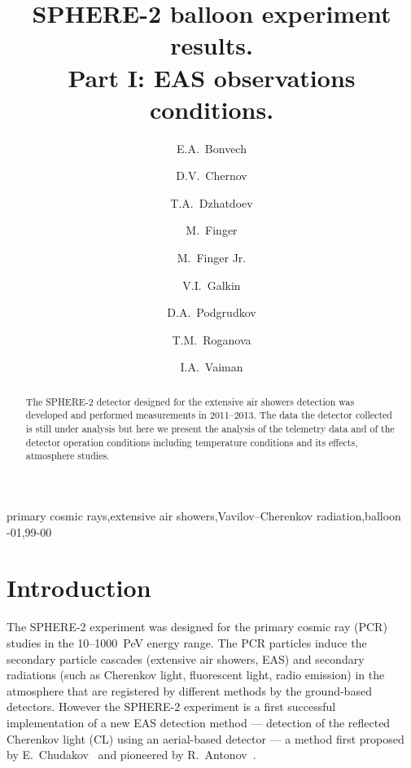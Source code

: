 \documentclass[final,5p,times,twocolumn]{elsarticle}
\begin{document}
\newcommand{\todoi}[1]{\todo[inline]{ #1}}

\listoftodos[Notes]
\linenumbers

\begin{frontmatter}
\title{SPHERE-2 balloon experiment results.\\ Part I: EAS observations conditions.}

\author[address1]{E.A.~Bonvech}
\author[address1]{D.V.~Chernov}
\author[address1]{T.A.~Dzhatdoev}
\author[address2,address3]{M.~Finger}
\author[address2,address3]{M.~Finger Jr.}
\author[address4]{V.I.~Galkin}
\author[address4,address1]{D.A.~Podgrudkov}
\author[address1]{T.M.~Roganova}
\author[address4,address1]{I.A.~Vaiman}
\address[address1]{M.V. Lomonosov Moscow State University, Skobeltsyn Institute of Nuclear Physics (SINP MSU), Moscow, Russia}
\address[address2]{Charles University, Faculty of Mathematics and Physics, Prague, Czech Republic}
\address[address3]{Joint Institute for Nuclear Research, Dubna, Russian Federation}
\address[address4]{M.V. Lomonosov Moscow State University, Department of Physics, Moscow, Russia}

\begin{abstract}
The SPHERE-2 detector designed for the extensive air showers detection was developed and performed measurements in 2011--2013. The data the detector collected is still under analysis but here we present the analysis of the telemetry data and of the detector operation conditions including temperature conditions and its effects, atmosphere studies.%
\end{abstract}

\begin{keyword}
primary cosmic rays\sep extensive air showers\sep Vavilov--Cherenkov radiation\sep balloon
-01\sep  99-00
\end{keyword}
\end{frontmatter}

\section{Introduction}
The SPHERE-2 experiment was designed for the primary cosmic ray (PCR) studies in the 10--1000~PeV energy range. The PCR particles induce the secondary particle cascades (extensive air showers, EAS) and secondary radiations (such as Cherenkov light, fluorescent light, radio emission) in the atmosphere that are registered by different methods by the ground-based detectors. However the SPHERE-2 experiment is a first successful implementation of a new EAS detection method --- detection of the reflected Cherenkov light (CL) using an aerial-based detector --- a method first proposed by E.~Chudakov~\cite{chu74:VKKL74} and pioneered by R.~Antonov~\cite{ant75, ant86, ant97, Ant15a}.
\end{document}
